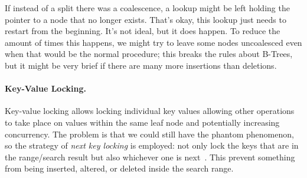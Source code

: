 If instead of a split there was a coalescence, a lookup might be left holding the pointer to a node that no longer exists. That's okay, this lookup just needs to restart from the beginning. It's not ideal, but it does happen. To reduce the amount of times this happens, we might try to leave some nodes uncoalesced even when that would be the normal procedure; this breaks the rules about B-Trees, but it might be very brief if there are many more insertions than deletions.

\paragraph{Key-Value Locking.} Key-value locking allows locking individual key values allowing other operations to take place on values within the same leaf node and potentially increasing concurrency. The problem is that we could still have the phantom phenomenon, so the strategy of \textit{next key locking} is employed: not only lock the keys that are in the range/search result but also whichever one is next~\cite{dsc}. This prevent something from being inserted, altered, or deleted inside the search range. 




